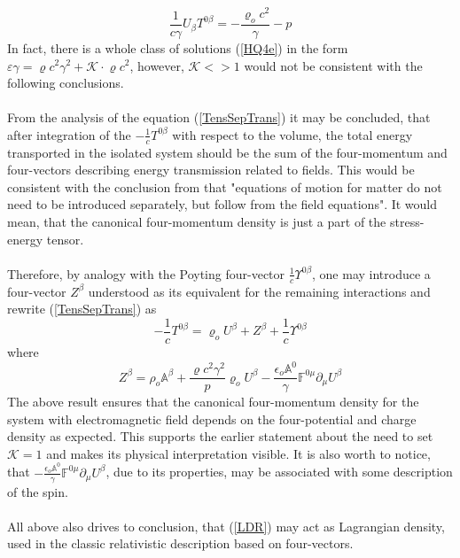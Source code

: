 \documentclass[aps,prx,preprint,groupedaddress,showkeys]{revtex4-2}
\begin{document}
\begin{equation} \label{LDR}
\frac{1}{c\gamma} U_{\beta} T^{0 \beta} = - \frac{\varrho_o c^2}{\gamma} - p
\end{equation} 
In fact, there is a whole class of solutions (\ref{HQ4e}) in the form $\varepsilon \gamma = \varrho c^2 \gamma ^2 + \mathcal{K} \cdot \varrho c^2$, however, $\mathcal{K}<>1$ would not be consistent with the following conclusions.\\ 
~\\
From the analysis of the equation (\ref{TensSepTrans}) it may be concluded, that after integration of the $-\frac{1}{c}T^{0 \beta}$ with respect to the volume, the total energy transported in the isolated system should be the sum of the four-momentum and four-vectors describing energy transmission related to fields. This would be consistent with the conclusion from \cite{SETH} that "equations of motion for matter do not need to be introduced separately, but follow from the field equations". It would mean, that the canonical four-momentum density is just a part of the stress-energy tensor.\\
~\\
Therefore, by analogy with the Poyting four-vector $\frac{1}{c}\Upsilon^{0 \beta}$, one may introduce a four-vector $Z^{\beta}$ understood as its equivalent for the remaining interactions and rewrite (\ref{TensSepTrans}) as
\begin{equation} \label{HQ4b}
- \frac{1}{c} T^{0 \beta} =  \varrho_o U^{\beta} + Z^{\beta} + \frac{1}{c}\Upsilon^{0 \beta}
\end{equation}
where
\begin{equation} \label{HQ4f}
Z^{\beta} = \rho_o \mathbb{A}^{\beta} + \frac{\varrho c^2 \gamma^2}{p}\varrho_o U^{\beta} - \frac{\epsilon_o \mathbb{A}^0}{\gamma} \mathbb{F}^{0 \mu} \partial_{\mu} U^{\beta}
\end{equation}
The above result ensures that the canonical four-momentum density for the system with electromagnetic field depends on the four-potential and charge density as expected. This supports the earlier statement about the need to set $\mathcal{K}=1$ and makes its physical interpretation visible. It is also worth to notice, that $ -\frac{\epsilon_o \mathbb{A}^0}{\gamma} \mathbb{F}^{0 \mu} \partial_{\mu} U^{\beta}$, due to its properties, may be associated with some description of the spin.\\
~\\
All above also drives to conclusion, that (\ref{LDR}) may act as Lagrangian density, used in the classic relativistic description based on four-vectors. \\
\end{document}
